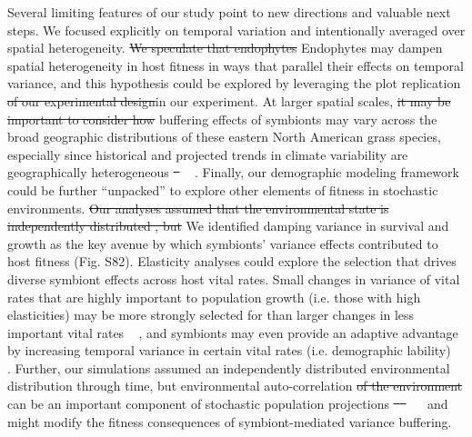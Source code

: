 \documentclass[lineno, sn-basic]{sn-jnl}%
\providecommand{\DIFadd}[1]{{\protect\color{blue}#1}} %
\providecommand{\DIFdel}[1]{{\protect\color{red}\protect\scriptsize\sout{#1}}}
\providecommand{\DIFadd}[1]{{\protect\color{blue}\uwave{#1}}} %
\providecommand{\DIFdel}[1]{{\protect\color{red}\sout{#1}}}                      %
\providecommand{\DIFaddbegin}{} %
\providecommand{\DIFaddend}{} %
\providecommand{\DIFdelbegin}{} %
\providecommand{\DIFdelend}{} %
\newcommand{\DIFscaledelfig}{0.5}
\newlength{\DIFdelgraphicswidth} %
\newlength{\DIFdelgraphicsheight} %
\newcommand{\DIFaddincludegraphics}[2][]{{\color{blue}\fbox{\DIFOincludegraphics[#1]{#2}}}} %
\newcommand{\DIFdelincludegraphics}[2][]{%
\sbox{\DIFdelgraphicsbox}{\DIFOincludegraphics[#1]{#2}}%
\settoboxwidth{\DIFdelgraphicswidth}{\DIFdelgraphicsbox} %
\settoboxtotalheight{\DIFdelgraphicsheight}{\DIFdelgraphicsbox} %
\scalebox{\DIFscaledelfig}{%
\parbox[b]{\DIFdelgraphicswidth}{\usebox{\DIFdelgraphicsbox}\\[-\baselineskip] \rule{\DIFdelgraphicswidth}{0em}}\llap{\resizebox{\DIFdelgraphicswidth}{\DIFdelgraphicsheight}{%
\setlength{\unitlength}{\DIFdelgraphicswidth}%
\begin{picture}(1,1)%
\thicklines\linethickness{2pt} %
{\color[rgb]{1,0,0}\put(0,0){\framebox(1,1){}}}%
{\color[rgb]{1,0,0}\put(0,0){\line( 1,1){1}}}%
{\color[rgb]{1,0,0}\put(0,1){\line(1,-1){1}}}%
\end{picture}%
}\hspace*{3pt}}} %
} %
\DeclareRobustCommand{\DIFaddbegin}{\DIFOaddbegin \let\includegraphics\DIFaddincludegraphics} %
\DeclareRobustCommand{\DIFaddend}{\DIFOaddend \let\includegraphics\DIFOincludegraphics} %
\DeclareRobustCommand{\DIFdelbegin}{\DIFOdelbegin \let\includegraphics\DIFdelincludegraphics} %
\DeclareRobustCommand{\DIFdelend}{\DIFOaddend \let\includegraphics\DIFOincludegraphics} %
\begin{document}
Several limiting features of our study point to new directions and valuable next steps. 
We focused explicitly on temporal variation and intentionally averaged over spatial heterogeneity. 
\DIFdelbegin \DIFdel{We speculate that endophytes }\DIFdelend \DIFaddbegin \DIFadd{Endophytes }\DIFaddend may dampen spatial heterogeneity in host fitness in ways that parallel their effects on temporal variance, and this hypothesis could be explored by leveraging the plot replication \DIFdelbegin \DIFdel{of our experimental design}\DIFdelend \DIFaddbegin \DIFadd{in our experiment}\DIFaddend . 
At larger spatial scales, \DIFdelbegin \DIFdel{it may be important to consider how }\DIFdelend buffering effects of symbionts \DIFaddbegin \DIFadd{may }\DIFaddend vary across the broad geographic distributions of these eastern North American grass species, especially since historical and projected trends in climate variability are geographically heterogeneous \DIFdelbegin \DIFdel{\mbox{%
\cite{bathiany2018climate}}\hspace{0pt}%
}\DIFdelend \DIFaddbegin \DIFadd{\mbox{%
\citep{bathiany2018climate}}\hspace{0pt}%
}\DIFaddend .
Finally, our demographic modeling framework could be further ``unpacked'' to explore other elements of fitness in stochastic environments. 
\DIFdelbegin \DIFdel{Our analyses assumed that the environmental state is independently distributed , but }\DIFdelend \DIFaddbegin \DIFadd{We identified damping variance in survival and growth as the key avenue by which symbionts' variance effects contributed to host fitness (Fig. S82). 
Elasticity analyses could explore the selection that drives diverse symbiont effects across host vital rates. 
Small changes in variance of vital rates that are highly important to population growth (i.e. those with high elasticities) may be more strongly selected for than larger changes in less important vital rates \mbox{%
\citep{doak2005correctly}}\hspace{0pt}%
, and symbionts may even provide an adaptive advantage by increasing temporal variance in certain vital rates (i.e. demographic lability) \mbox{%
\citep{koons2009life}}\hspace{0pt}%
.
Further, our simulations assumed an independently distributed environmental distribution through time, but environmental }\DIFaddend auto-correlation \DIFdelbegin \DIFdel{of the environment }\DIFdelend can be an important component of stochastic population projections \DIFdelbegin \DIFdel{\mbox{%
\cite{tuljapurkar2006temporal} }\hspace{0pt}%
}\DIFdelend \DIFaddbegin \DIFadd{\mbox{%
\citep{tuljapurkar2006temporal} }\hspace{0pt}%
}\DIFaddend and might modify the fitness consequences of symbiont-mediated variance buffering. 
\end{document}
